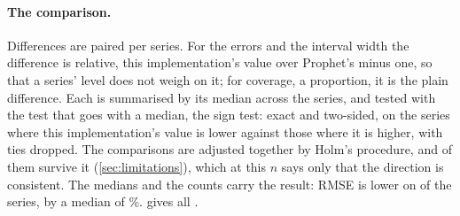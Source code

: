 \paragraph{The comparison.}
Differences are paired per series. For the errors and the interval width the
difference is relative, this implementation's value over Prophet's minus one, so that a
series' level does not weigh on it; for coverage, a proportion, it is the plain
difference. Each is summarised by its median across the series, and tested with the test
that goes with a median, the sign test: exact and two-sided, on the series where this
implementation's value is lower against those where it is higher, with ties dropped. The
\LimHolmComparisons{} comparisons are adjusted together by Holm's procedure, and
\LimHolmSurvivors{} of them survive it (\cref{sec:limitations}), which at this $n$ says
only that the direction is consistent.
The medians and the counts carry the result: RMSE is lower on \RmseWins{} of the
\CensusSeries{} series, by a median of \RmseAdvantage\%.  gives
all \LimHolmComparisons.

\begin{table}[ht]
  \centering
  \small
  \caption{The \LimHolmComparisons{} paired comparisons on the \CensusSeries{} series of
    the census. The median difference is this implementation's value over Prophet's
    minus one, in percent, for the errors and the interval width, and the plain
    difference for coverage. Lower, higher and tied count the series where this
    implementation's value is below, above or equal to Prophet's; the sign test drops
    the ties. The $p$-values are Holm-adjusted across the \LimHolmComparisons.}
  \label{tab:forecast}
  
\end{table}
